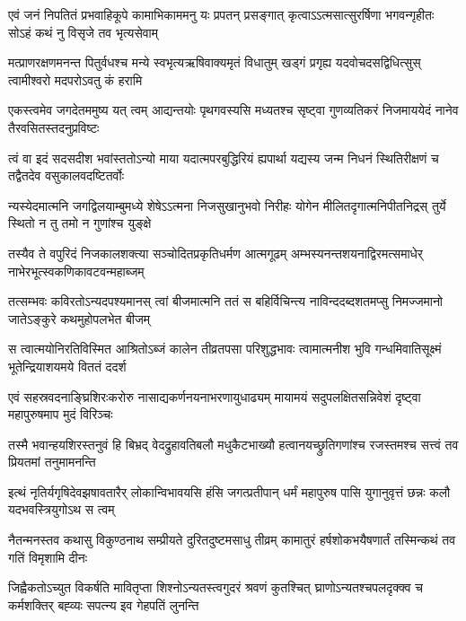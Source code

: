 \fourlineindentedshloka
{एवं जनं निपतितं प्रभवाहिकूपे}
{कामाभिकाममनु यः प्रपतन् प्रसङ्गात्}
{कृत्वाऽऽत्मसात्सुरर्षिणा भगवन्गृहीतः}
{सोऽहं कथं नु विसृजे तव भृत्यसेवाम्} %

\fourlineindentedshloka
{मत्प्राणरक्षणमनन्त पितुर्वधश्च}
{मन्ये स्वभृत्यऋषिवाक्यमृतं विधातुम्}
{खड्गं प्रगृह्य यदवोचदसद्विधित्सुस्}
{त्वामीश्वरो मदपरोऽवतु कं हरामि} %

\fourlineindentedshloka
{एकस्त्वमेव जगदेतममुष्य यत् त्वम्}
{आद्यन्तयोः पृथगवस्यसि मध्यतश्च}
{सृष्ट्वा गुणव्यतिकरं निजमाययेदं}
{नानेव तैरवसितस्तदनुप्रविष्टः} %

\fourlineindentedshloka
{त्वं वा इदं सदसदीश भवांस्ततोऽन्यो}
{माया यदात्मपरबुद्धिरियं ह्यपार्था}
{यद्यस्य जन्म निधनं स्थितिरीक्षणं च}
{तद्वैतदेव वसुकालवदष्टितर्वोः} %

\fourlineindentedshloka
{न्यस्येदमात्मनि जगद्विलयाम्बुमध्ये}
{शेषेऽऽत्मना निजसुखानुभवो निरीहः}
{योगेन मीलितदृगात्मनिपीतनिद्रस्}
{तुर्ये स्थितो न तु तमो न गुणांश्च युङ्क्षे} %

\fourlineindentedshloka
{तस्यैव ते वपुरिदं निजकालशक्त्या}
{सञ्चोदितप्रकृतिधर्मण आत्मगूढम्}
{अम्भस्यनन्तशयनाद्विरमत्समाधेर्}
{नाभेरभूत्स्वकणिकावटवन्महाब्जम्} %

\fourlineindentedshloka
{तत्सम्भवः कविरतोऽन्यदपश्यमानस्}
{त्वां बीजमात्मनि ततं स बहिर्विचिन्त्य}
{नाविन्ददब्दशतमप्सु निमज्जमानो}
{जातेऽङ्कुरे कथमुहोपलभेत बीजम्} %

\fourlineindentedshloka
{स त्वात्मयोनिरतिविस्मित आश्रितोऽब्जं}
{कालेन तीव्रतपसा परिशुद्धभावः}
{त्वामात्मनीश भुवि गन्धमिवातिसूक्ष्मं}
{भूतेन्द्रियाशयमये विततं ददर्श} %

\fourlineindentedshloka
{एवं सहस्रवदनाङ्घ्रिशिरःकरोरु}
{नासाद्यकर्णनयनाभरणायुधाढ्यम्}
{मायामयं सदुपलक्षितसन्निवेशं}
{दृष्ट्वा महापुरुषमाप मुदं विरिञ्चः} %

\fourlineindentedshloka
{तस्मै भवान्हयशिरस्तनुवं हि बिभ्रद्}
{वेदद्रुहावतिबलौ मधुकैटभाख्यौ}
{हत्वानयच्छ्रुतिगणांश्च रजस्तमश्च}
{सत्त्वं तव प्रियतमां तनुमामनन्ति} %

\fourlineindentedshloka
{इत्थं नृतिर्यगृषिदेवझषावतारैर्}
{लोकान्विभावयसि हंसि जगत्प्रतीपान्}
{धर्मं महापुरुष पासि युगानुवृत्तं}
{छन्नः कलौ यदभवस्त्रियुगोऽथ स त्वम्} %

\fourlineindentedshloka
{नैतन्मनस्तव कथासु विकुण्ठनाथ}
{सम्प्रीयते दुरितदुष्टमसाधु तीव्रम्}
{कामातुरं हर्षशोकभयैषणार्तं}
{तस्मिन्कथं तव गतिं विमृशामि दीनः} %

\fourlineindentedshloka
{जिह्वैकतोऽच्युत विकर्षति मावितृप्ता}
{शिश्नोऽन्यतस्त्वगुदरं श्रवणं कुतश्चित्}
{घ्राणोऽन्यतश्चपलदृक्क्व च कर्मशक्तिर्}
{बह्व्यः सपत्न्य इव गेहपतिं लुनन्ति} %

